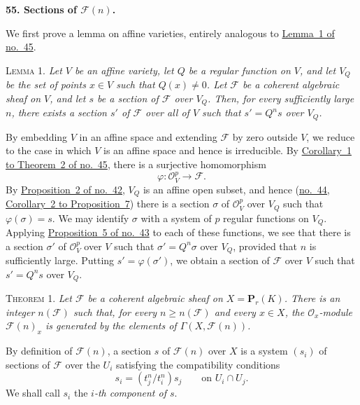 
\label{fac:III:2:no:55}
\textbf{55. Sections of $\mathcal{F}(n)$.}

We first prove a lemma on affine varieties, entirely analogous to \hyperref[fac:II:3:no:45:lemma:1]{Lemma~1 of
no.~45}.

\label{fac:III:2:no:55:lemma:1}
\textsc{Lemma 1.}
\textit{Let $V$ be an affine variety, let $Q$ be a regular function on $V$,
and let $V_Q$ be the set of points $x\in V$ such that $Q(x)\neq0$. Let
$\mathcal{F}$ be a coherent algebraic sheaf on $V$, and let $s$ be a section
of $\mathcal{F}$ over $V_Q$. Then, for every sufficiently large $n$, there
exists a section $s'$ of $\mathcal{F}$ over all of $V$ such that
$s'=Q^ns$ over $V_Q$.}

By embedding $V$ in an affine space and extending $\mathcal{F}$ by zero
outside $V$, we reduce to the case in which $V$ is an affine space and hence
is irreducible. By \hyperref[fac:II:3:no:45:thm:2:cor:1]{Corollary~1 to Theorem~2 of no.~45}, there is a surjective
homomorphism
\[
\varphi:\mathcal{O}_V^p\longrightarrow\mathcal{F}.
\]
By \hyperref[fac:II:3:no:42:prop:2]{Proposition~2 of no.~42}, $V_Q$ is an affine open subset, and hence
(\hyperref[fac:II:3:no:44:prop:7:cor:2]{no.~44, Corollary~2 to Proposition~7}) there is a section $\sigma$ of
$\mathcal{O}_V^p$ over $V_Q$ such that $\varphi(\sigma)=s$. We may identify
$\sigma$ with a system of $p$ regular functions on $V_Q$. Applying
\hyperref[fac:II:3:no:43:prop:5]{Proposition~5 of no.~43} to each of these functions, we see that there is a
section $\sigma'$ of $\mathcal{O}_V^p$ over $V$ such that
$\sigma'=Q^n\sigma$ over $V_Q$, provided that $n$ is sufficiently large.
Putting $s'=\varphi(\sigma')$, we obtain a section of $\mathcal{F}$ over $V$
such that $s'=Q^ns$ over $V_Q$.

\label{fac:III:2:no:55:theorem:1}
\textsc{Theorem 1.}
\textit{Let $\mathcal{F}$ be a coherent algebraic sheaf on
$X=\mathbf{P}_r(K)$. There is an integer $n(\mathcal{F})$ such that, for
every $n\geq n(\mathcal{F})$ and every $x\in X$, the
$\mathcal{O}_x$-module $\mathcal{F}(n)_x$ is generated by the elements of
$\Gamma(X,\mathcal{F}(n))$.}

By definition of $\mathcal{F}(n)$, a section $s$ of $\mathcal{F}(n)$ over
$X$ is a system $(s_i)$ of sections of $\mathcal{F}$ over the $U_i$
satisfying the compatibility conditions
\label{fac:III:2:no:55:formula:compatibility}
\[
s_i=(t_j^n/t_i^n)s_j
\qquad\text{on }U_i\cap U_j.
\]
\label{fac:III:2:no:55:def:i-th-component}
We shall call $s_i$ the \textit{$i$-th component of $s$}.

